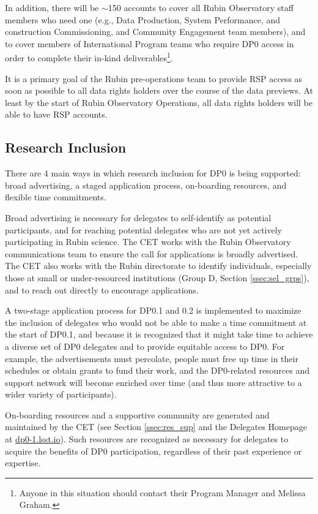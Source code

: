 \documentclass[DM,lsstdraft,authoryear,toc]{lsstdoc}
\begin{document}
In addition, there will be $\sim$150 accounts to cover all Rubin Observatory staff members who need one (e.g., Data Production, System Performance, and construction Commissioning, and Community Engagement team members), and to cover members of International Program teams who require DP0 access in order to complete their in-kind deliverables\footnote{Anyone in this situation should contact their Program Manager and Melissa Graham.}.

It is a primary goal of the Rubin pre-operations team to provide RSP access as soon as possible to all data rights holders over the course of the data previews. 
At least by the start of Rubin Observatory Operations, all data rights holders will be able to have RSP accounts.


\subsection{Research Inclusion}\label{ssec:intro_RI}

There are 4 main ways in which research inclusion for DP0 is being supported: broad advertising, a staged application process, on-boarding resources, and flexible time commitments.

Broad advertising is necessary for delegates to self-identify as potential participants, and for reaching potential delegates who are not yet actively participating in Rubin science.
The CET works with the Rubin Observatory communications team to ensure the call for applications is broadly advertised. 
The CET also works with the Rubin directorate to identify individuals, especially those at small or under-resourced institutions (Group D, Section \ref{ssec:sel_grps}), and to reach out directly to encourage applications. 

A two-stage application process for DP0.1 and 0.2 is implemented to maximize the inclusion of delegates who would not be able to make a time commitment at the start of DP0.1, and because it is recognized that it might take time to achieve a diverse set of DP0 delegates and to provide equitable access to DP0.
For example, the advertisements must percolate, people must free up time in their schedules or obtain grants to fund their work, and the DP0-related resources and support network will become enriched over time (and thus more attractive to a wider variety of participants).

On-boarding resources and a supportive community are generated and maintained by the CET (see Section \ref{ssec:res_sup} and the Delegates Homepage at \url{dp0-1.lsst.io}).
Such resources are recognized as necessary for delegates to acquire the benefits of DP0 participation, regardless of their past experience or expertise.
\end{document}
